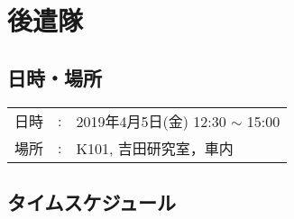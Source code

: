 %

\section{後遣隊}

\subsection{日時・場所}

\begin{tabular}{p{}rp{}}
  日時 & : & 2019年4月5日(金) 12:30 $\sim$ 15:00\\
  場所 & : & K101, 吉田研究室，車内
\end{tabular}

\subsection{タイムスケジュール}


